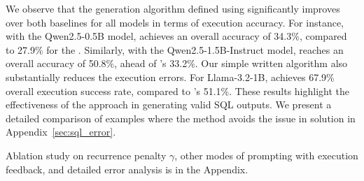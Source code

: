 We observe that the generation algorithm defined using \Tool{} significantly improves over both baselines for all models in terms of execution accuracy.
For instance, with the Qwen2.5-0.5B model, \Tool{} achieves an overall accuracy of 34.3\%, compared to 27.9\% for the \syncode{}.
Similarly, with the Qwen2.5-1.5B-Instruct model, \Tool{} reaches an overall accuracy of 50.8\%, ahead of \syncode{}'s 33.2\%. 
Our simple \Tool{} written algorithm also substantially reduces the execution errors.  
For Llama-3.2-1B, \Tool{} achieves 67.9\% overall execution success rate, compared to \standard{}'s 51.1\%. 
These results highlight the effectiveness of the \Tool{} approach in generating valid SQL outputs.
We present a detailed comparison of examples where the \Tool{} method avoids the issue in \syncode{} solution in Appendix~\ref{sec:sql_error}.


Ablation study on recurrence penalty $\gamma$, other modes of prompting with execution feedback, and detailed error analysis is in the Appendix.









